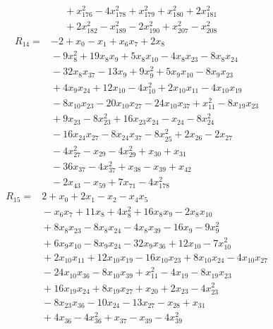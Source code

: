 {\begin{align*}
&{}  + x_{176}^{2} - 4x_{178}^{2} + x_{179}^{2} + x_{180}^{2} + 2x_{181}^{2} \\
&{}  + 2x_{182}^{2} - x_{189}^{2} - 2x_{190}^{2} + x_{207}^{2} - x_{208}^{2}
\end{align*}
\begin{align*}
R_{14} ={}& -2 + x_{0} - x_{1} + x_{6} x_{7} + 2x_{8} \\
&{}  - 9x_{8}^{2} + 19x_{8} x_{9} + 5x_{8} x_{10} - 4x_{8} x_{23} - 8x_{8} x_{24} \\
&{}  - 32x_{8} x_{37} - 13x_{9} + 9x_{9}^{2} + 5x_{9} x_{10} - 8x_{9} x_{23} \\
&{}  + 4x_{9} x_{24} + 12x_{10} - 4x_{10}^{2} + 2x_{10} x_{11} - 4x_{10} x_{19} \\
&{}  - 8x_{10} x_{23} - 20x_{10} x_{27} - 24x_{10} x_{37} + x_{11}^{2} - 8x_{19} x_{23} \\
&{}  + 9x_{23} - 8x_{23}^{2} + 16x_{23} x_{24} - x_{24} - 8x_{24}^{2} \\
&{}  - 16x_{24} x_{27} - 8x_{24} x_{37} - 8x_{25}^{2} + 2x_{26} - 2x_{27} \\
&{}  - 4x_{27}^{2} - x_{29} - 4x_{29}^{2} + x_{30} + x_{31} \\
&{}  - 36x_{37} - 4x_{37}^{2} + x_{38} - x_{39} + x_{42} \\
&{}  - 2x_{43} - x_{59} + 7x_{71} - 4x_{178}^{2}
\end{align*}
\begin{align*}
R_{15} ={}& 2 + x_{0} + 2x_{1} - x_{2} - x_{4} x_{5} \\
&{}  - x_{6} x_{7} + 11x_{8} + 4x_{8}^{2} + 16x_{8} x_{9} - 2x_{8} x_{10} \\
&{}  + 8x_{8} x_{23} - 8x_{8} x_{24} - 4x_{8} x_{39} - 16x_{9} - 9x_{9}^{2} \\
&{}  + 6x_{9} x_{10} - 8x_{9} x_{24} - 32x_{9} x_{36} + 12x_{10} - 7x_{10}^{2} \\
&{}  + 2x_{10} x_{11} + 12x_{10} x_{19} - 16x_{10} x_{23} + 8x_{10} x_{24} - 4x_{10} x_{27} \\
&{}  - 24x_{10} x_{36} - 8x_{10} x_{39} + x_{11}^{2} - 4x_{19} - 8x_{19} x_{23} \\
&{}  + 16x_{19} x_{24} + 8x_{19} x_{27} + x_{20} + 2x_{23} - 4x_{23}^{2} \\
&{}  - 8x_{23} x_{36} - 10x_{24} - 13x_{27} - x_{28} + x_{31} \\
&{}  + 4x_{36} - 4x_{36}^{2} + x_{37} - x_{39} - 4x_{39}^{2} \\

\end{align*}}
